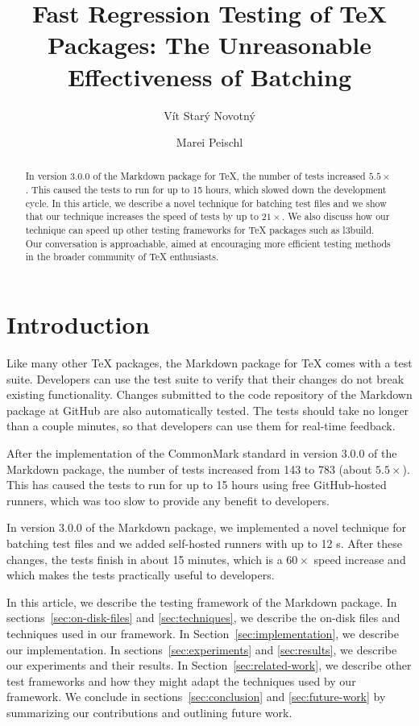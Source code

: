 \documentclass[final]{ltugboat}
\title{Fast Regression Testing of \TeX{} Packages: The Unreasonable Effectiveness of Batching}
\author{Vít Starý Novotný}
\author{Marei Peischl}
\begin{document}
\maketitle

\begin{abstract}
In version 3.0.0 of the Markdown package for \TeX, the number of tests increased $5.5\times$. This caused the tests to run for up to 15 hours, which slowed down the development cycle. In this article, we describe a novel technique for batching test files and we show that our technique increases the speed of tests by up to $21\times$. We also discuss how our technique can speed up other testing frameworks for \TeX{} packages such as l3build. Our conversation is approachable, aimed at encouraging more efficient testing methods in the broader community of \TeX{} enthusiasts.
\end{abstract}

\section{Introduction}
Like many other \TeX{} packages, the Markdown package for \TeX{} comes with a test suite. Developers can use the test suite to verify that their changes do not break existing functionality. Changes submitted to the code repository of the Markdown package at GitHub are also automatically tested. The tests should take no longer than a couple minutes, so that developers can use them for real-time feedback.

After the implementation of the CommonMark standard in version 3.0.0 of the Markdown package, the number of tests increased from 143 to 783 (about $5.5\times$). This has caused the tests to run for up to 15 hours using free GitHub-hosted runners, which was too slow to provide any benefit to developers.

In version 3.0.0 of the Markdown package, we implemented a novel technique for batching test files and we added self-hosted runners with up to 12 s. After these changes, the tests finish in about 15 minutes, which is a $60\times$ speed increase and which makes the tests practically useful to developers.

In this article, we describe the testing framework of the Markdown package. In sections~\ref{sec:on-disk-files} and \ref{sec:techniques}, we describe the on-disk files and techniques used in our framework. In Section~\ref{sec:implementation}, we describe our implementation. In sections~\ref{sec:experiments} and \ref{sec:results}, we describe our experiments and their results. In Section~\ref{sec:related-work}, we describe other test frameworks and how they might adapt the techniques used by our framework. We conclude in sections~\ref{sec:conclusion} and \ref{sec:future-work} by summarizing our contributions and outlining future work.
\end{document}
